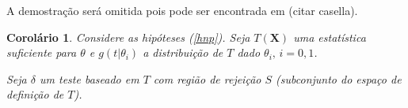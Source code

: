 \documentclass[a4paper,10pt, notitlepage]{report}
\newtheorem{col}{Corolário}
\newcommand{\bX}{\boldsymbol{X}} %
\begin{document}
	A demostração será omitida pois pode ser encontrada em (citar casella).
	
	\begin{col}
		Considere as hipóteses (\ref{hnp}). Seja $T(\bX)$ uma estatística suficiente para $\theta$ e $g(t|\theta_i)$ a distribuição de $T$ dado $\theta_i,\,i=0,1$.
		
		Seja $\delta$ um teste baseado em $T$ com região de rejeição $S$ (subconjunto do espaço de definição de $T$).
	\end{col}
	
	
	
	
	
	
	
\end{document}
